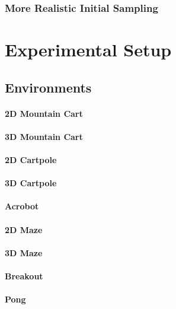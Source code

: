 \documentclass{article}
\begin{document}
\subsubsection{More Realistic Initial Sampling}

\section{Experimental Setup}

\subsection{Environments}

\paragraph{2D Mountain Cart}

\paragraph{3D Mountain Cart}

\paragraph{2D Cartpole}

\paragraph{3D Cartpole}

\paragraph{Acrobot}

\paragraph{2D Maze}

\paragraph{3D Maze}

\paragraph{Breakout}

\paragraph{Pong}
\end{document}
